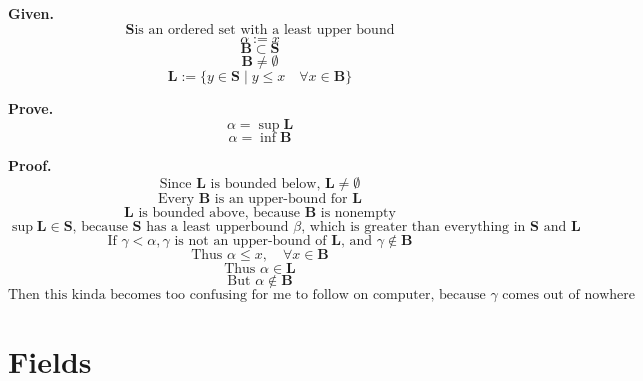 \documentclass{article}
\newcommand{\set}[2]{
	\{ #1 \mid #2 \}
}
\begin{document}
{\bf Given.}
	$$ \mathbf{S} \text{is an ordered set with a least upper bound} $$
	$$ \alpha := x $$
	$$ \mathbf{B} \subset \mathbf{S} $$
	$$ \mathbf{B} \neq \emptyset $$
	$$ \mathbf{L} := \set{y \in \mathbf{S}}{y \leq x \quad \forall x \in \mathbf{B}} $$

{\bf Prove.}
	$$ \alpha = \sup\mathbf{L} $$
	$$ \alpha = \inf\mathbf{B} $$
	
{\bf Proof.}
	$$ \text{Since $\mathbf{L}$ is bounded below, } \mathbf{L} \neq \emptyset $$
	$$ \text{Every $\mathbf{B}$ is an upper-bound for $\mathbf{L}$} $$
	$$ \text{$\mathbf{L}$ is bounded above, because $\mathbf{B}$ is nonempty} $$
	$$ \sup\mathbf{L} \in \mathbf{S} \text{, because $\mathbf{S}$ has a least upperbound $\beta$, which is greater than everything in $\mathbf{S}$ and $\mathbf{L}$} $$
	$$ \text{If } \gamma < \alpha, \gamma \text{ is not an upper-bound of } \mathbf{L} \text{, and } \gamma \notin \mathbf{B} $$
	$$ \text{Thus } \alpha \leq x, \quad \forall x \in \mathbf{B} $$
	$$ \text{Thus } \alpha \in \mathbf{L} $$
	$$ \text{But } \alpha \notin \mathbf{B} $$
	$$ \text{Then this kinda becomes too confusing for me to follow on computer, because $\gamma$ comes out of nowhere} $$
	
\section{Fields}
\end{document}
